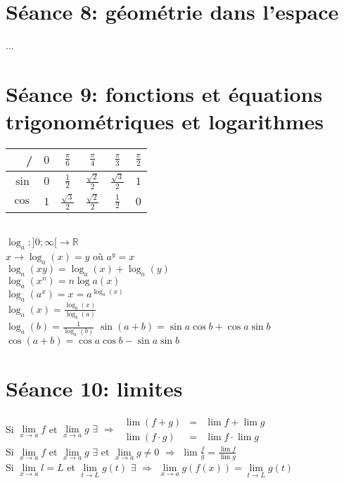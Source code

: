 \documentclass[12pt]{article}
\begin{document}
\section*{S\'eance 8: g\'eom\'etrie dans l'espace}
...

\section*{S\'eance 9: fonctions et \'equations trigonom\'etriques et logarithmes}

\begin{tabular}{r|ccccc}
	/ & $0$ & $\frac{\pi}{6}$ & $\frac{\pi}{4}$ & $\frac{\pi}{3}$ & $\frac{\pi}{2}$ \\
	\hline
	$\sin$ & $0$ & $\frac{1}{2}$ & $\frac{\sqrt{2}}{2}$ & $\frac{\sqrt{3}}{2}$ & $1$ \\
	$\cos$ & $1$ & $\frac{\sqrt{3}}{2}$ & $\frac{\sqrt{2}}{2}$ & $\frac{1}{2}$ & $0$\\
\end{tabular} \\ \newline
\indent$\log_{a} : ]0; \infty[ \rightarrow \mathbb{R}$ \\
\indent$x \rightarrow \log_{a}(x) = y$ o\`u $a^{y}=x$ \\ \newline
$\log_{a}(xy) = \log_{a}(x) + \log_{a}(y)$ \\
$\log_{a}(x^{n}) = n\log{a}(x)$ \\
$\log_{a}(a^{x}) = x = a^{\log_{a}(x)}$ \\
$\log_{a}(x) = \frac{\log_{b}(x)}{\log_{b}(a)}$ \\ 
$\log_{a}(b) = \frac{1}{\log_{a}(b)}$
\newline
$\sin{(a+b)} = \sin{a}\cos{b}+\cos{a}\sin{b}$ \\ 
$\cos{(a+b)} = \cos{a}\cos{b}-\sin{a}\sin{b}$

\section*{S\'eance 10: limites}

Si $\underset{x\to a}\lim f$ et $\underset{x\to a}\lim g$  $\exists$ $\Rightarrow$ 
\(
\begin{array}{lcl}
    \lim (f+g) & = & \lim f + \lim g \\
    \lim (f \cdot g) & = &  \lim f \cdot \lim g 
\end{array}\) \\ \newline
\indent Si $\underset{x\to a}\lim f$ et $\underset{x\to a}\lim g$  $\exists$ et $\underset{x\to a}\lim g \not= 0$ $\Rightarrow$ $\lim{\frac{f}{g}} = \frac{\lim{f}}{\lim{g}}$ \\ \newline
\indent Si $\underset{x\to a}\lim l = L$ et $\underset{t\to L}\lim g(t)$  $\exists$ $\Rightarrow$ $\underset{x\to a}\lim g(f(x)) = \underset{t\to L}\lim  g(t)$ \\
\end{document}
